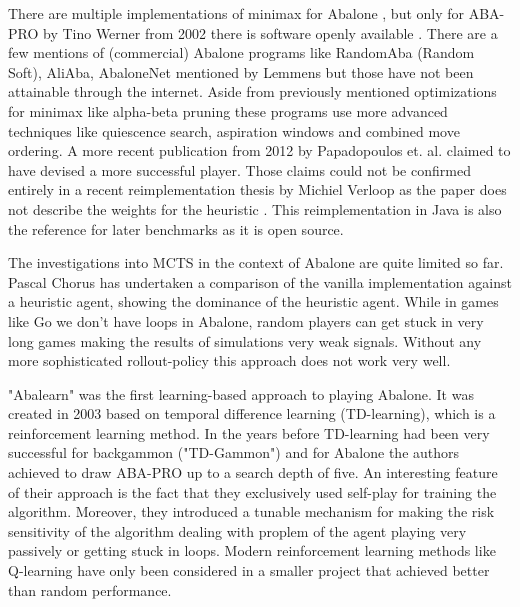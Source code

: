 There are multiple implementations of minimax for Abalone \cite{chorus_implementing_2009,lemmens_constructing_2005,ozcan_simple_2004-1,aichholzer_algorithmic_2002}, but only for ABA-PRO by Tino Werner from 2002 there is software openly available \cite{aichholzer_oswin_2006}.  There are a few mentions of (commercial) Abalone programs like RandomAba (Random Soft), AliAba, AbaloneNet mentioned by Lemmens \cite[p. 7]{lemmens_constructing_2005} but those have not been attainable through the internet. Aside from previously mentioned optimizations for minimax like alpha-beta pruning these programs use more advanced techniques like quiescence search, aspiration windows and combined move ordering. A more recent publication from 2012 by Papadopoulos et. al. claimed to have devised a more successful player. \cite{papadopoulos_exploring_2012}  Those claims could not be confirmed entirely in a recent reimplementation thesis by Michiel Verloop as the paper does not describe the weights for the heuristic \cite{verloop_critical_nodate}. This reimplementation in Java \cite{verloop_abaloneai_nodate} is also the reference for later benchmarks as it is open source. \cite{verloop_abaloneai_nodate}

The investigations into MCTS in the context of Abalone are quite limited so far. Pascal Chorus has undertaken a comparison of the vanilla implementation against a heuristic agent, showing the dominance of the heuristic agent. \cite{chorus_implementing_2009} While in games like Go we don't have loops in Abalone, random players can get stuck in very long games making the results of simulations very weak signals. Without any more sophisticated rollout-policy this approach does not work very well.

"Abalearn" was the first learning-based approach to playing Abalone. \cite{campos_abalearn_2003} It was created in 2003 based on temporal difference learning (TD-learning), which is a reinforcement learning method. In the years before TD-learning had been very successful for backgammon ("TD-Gammon") \cite{tesauro_td-gammon_1994} and for Abalone the authors achieved to draw ABA-PRO up to a search depth of five. An interesting feature of their approach is the fact that they exclusively used self-play for training the algorithm. Moreover, they introduced a tunable mechanism for making the risk sensitivity of the algorithm dealing with proplem of the agent playing very passively or getting stuck in loops. Modern reinforcement learning methods like Q-learning have only been considered in a smaller project that achieved better than random performance. \cite{mizrachi_introduction_2017}